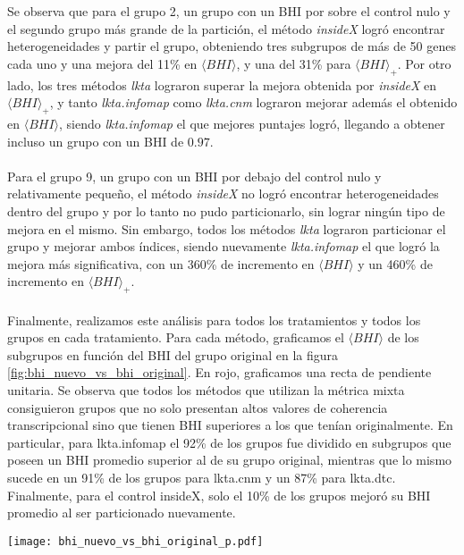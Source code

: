 \clearpage
Se observa que para el grupo 2, un grupo con un BHI por sobre el control nulo y el segundo grupo más grande de la partición, el método \textit{insideX} logró encontrar heterogeneidades y partir el grupo, obteniendo tres subgrupos de más de 50 genes cada uno y una mejora del 11\% en $\langle BHI \rangle$, y una del 31\% para $\langle BHI \rangle _{+}$. Por otro lado, los tres métodos \textit{lkta} lograron superar la mejora obtenida por \textit{insideX} en $\langle BHI \rangle _{+}$, y tanto \textit{lkta.infomap} como \textit{lkta.cnm} lograron mejorar además el obtenido en $\langle BHI \rangle$, siendo \textit{lkta.infomap} el que mejores puntajes logró, llegando a obtener incluso un grupo con un BHI de $0.97$.\\\\
Para el grupo 9, un grupo con un BHI por debajo del control nulo y relativamente pequeño, el método \textit{insideX} no logró encontrar heterogeneidades dentro del grupo y por lo tanto no pudo particionarlo, sin lograr ningún tipo de mejora en el mismo. Sin embargo, todos los métodos \textit{lkta} lograron particionar el grupo y mejorar ambos índices, siendo nuevamente \textit{lkta.infomap} el que logró la mejora más significativa, con un 360\% de incremento en $\langle BHI \rangle$ y un 460\% de incremento en $\langle BHI \rangle _{+}$.\\\\
Finalmente, realizamos este análisis para todos los tratamientos y todos los grupos en cada tratamiento. Para cada método, graficamos el $\langle BHI \rangle$ de los subgrupos en función del BHI del grupo original en la figura \ref{fig:bhi_nuevo_vs_bhi_original}. En rojo, graficamos una recta de pendiente unitaria. Se observa que todos los métodos que utilizan la métrica mixta consiguieron grupos que no solo presentan altos valores de coherencia transcripcional sino que tienen BHI superiores a los que tenían originalmente. En particular, para lkta.infomap el 92\% de los grupos fue dividido en subgrupos que poseen un BHI promedio superior al de su grupo original, mientras que lo mismo sucede en un 91\% de los grupos para lkta.cnm y un 87\% para lkta.dtc. Finalmente, para el control insideX, solo el 10\% de los grupos mejoró su BHI promedio al ser particionado nuevamente.
\begin{center}
\texttt{[image: bhi\_nuevo\_vs\_bhi\_original\_p.pdf]}
\label{fig:bhi_nuevo_vs_bhi_original}
\end{center}
